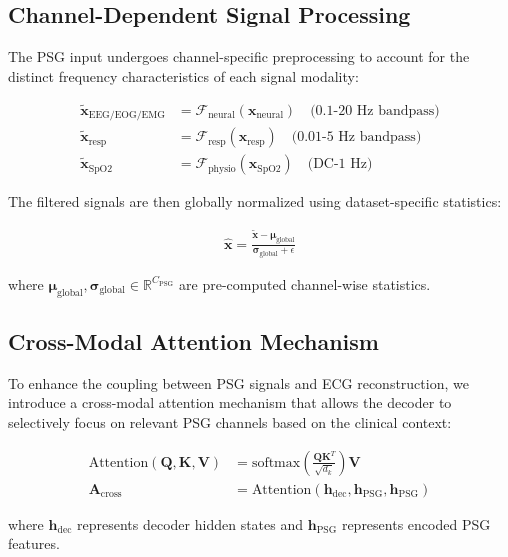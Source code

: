 \documentclass[11pt]{article}
\begin{document}
\subsection{Channel-Dependent Signal Processing}

The PSG input undergoes channel-specific preprocessing to account for the distinct frequency characteristics of each signal modality:

\begin{align}
\tilde{\mathbf{x}}_{\text{EEG/EOG/EMG}} &= \mathcal{F}_{\text{neural}}(\mathbf{x}_{\text{neural}}) \quad \text{(0.1-20 Hz bandpass)} \\
\tilde{\mathbf{x}}_{\text{resp}} &= \mathcal{F}_{\text{resp}}(\mathbf{x}_{\text{resp}}) \quad \text{(0.01-5 Hz bandpass)} \\
\tilde{\mathbf{x}}_{\text{SpO2}} &= \mathcal{F}_{\text{physio}}(\mathbf{x}_{\text{SpO2}}) \quad \text{(DC-1 Hz)}
\end{align}

The filtered signals are then globally normalized using dataset-specific statistics:

\begin{align}
\hat{\mathbf{x}} = \frac{\tilde{\mathbf{x}} - \boldsymbol{\mu}_{\text{global}}}{\boldsymbol{\sigma}_{\text{global}} + \epsilon}
\end{align}

where $\boldsymbol{\mu}_{\text{global}}, \boldsymbol{\sigma}_{\text{global}} \in \mathbb{R}^{C_{\text{PSG}}}$ are pre-computed channel-wise statistics.

\subsection{Cross-Modal Attention Mechanism}

To enhance the coupling between PSG signals and ECG reconstruction, we introduce a cross-modal attention mechanism that allows the decoder to selectively focus on relevant PSG channels based on the clinical context:

\begin{align}
\text{Attention}(\mathbf{Q}, \mathbf{K}, \mathbf{V}) &= \text{softmax}\left(\frac{\mathbf{Q}\mathbf{K}^T}{\sqrt{d_k}}\right)\mathbf{V} \\
\mathbf{A}_{\text{cross}} &= \text{Attention}(\mathbf{h}_{\text{dec}}, \mathbf{h}_{\text{PSG}}, \mathbf{h}_{\text{PSG}})
\end{align}

where $\mathbf{h}_{\text{dec}}$ represents decoder hidden states and $\mathbf{h}_{\text{PSG}}$ represents encoded PSG features.
\end{document}
